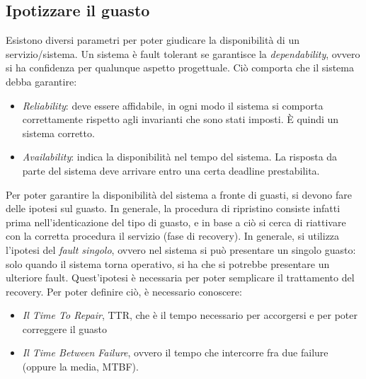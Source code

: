 \subsection{Ipotizzare il guasto}
Esistono diversi parametri per poter giudicare la disponibilità di un servizio/sistema.
Un sistema è fault tolerant se garantisce la \textit{dependability}, ovvero si ha confidenza per qualunque aspetto
progettuale. Ciò comporta che il sistema debba garantire:
\begin{itemize}
 \item \textit{Reliability}: deve essere affidabile, in ogni modo il sistema si comporta correttamente rispetto agli
invarianti che sono stati imposti. È quindi un sistema corretto.
 \item \textit{Availability}: indica la disponibilità nel tempo del sistema. La risposta da parte del sistema deve
arrivare entro una certa deadline prestabilita.
\end{itemize}
Per poter garantire la disponibilità del sistema a fronte di guasti, si devono fare delle ipotesi sul guasto. In
generale, la procedura di ripristino consiste infatti prima nell'identicazione del tipo di guasto, e in base a ciò si
cerca di riattivare con la corretta procedura il servizio (fase di recovery).
In generale, si utilizza l'ipotesi del \textit{fault singolo}, ovvero nel sistema si può presentare un singolo guasto:
solo quando il sistema torna operativo, si ha che si potrebbe presentare un ulteriore fault. Quest'ipotesi è necessaria
per poter semplicare il trattamento del recovery. Per poter definire ciò, è necessario conoscere:
\begin{itemize}
 \item \textit{Il Time To Repair}, TTR, che è il tempo necessario per accorgersi e per poter correggere il guasto
 \item \textit{Il Time Between Failure}, ovvero il tempo che intercorre fra due failure (oppure la media, MTBF).
\end{itemize}

